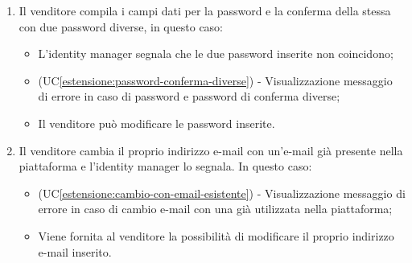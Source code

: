 \begin{itemize}
\begin{enumerate}[label=\lett]
    	\item Il venditore compila i campi dati per la password e la conferma della stessa con due password diverse, in questo caso:
    	\begin{itemize}
    		\item L'identity manager segnala che le due password inserite non coincidono;
    		\item (UC\ref{estensione:password-conferma-diverse}) - Visualizzazione messaggio di errore in caso di password e password di conferma diverse;
    		\item Il venditore può modificare le password inserite.
    	\end{itemize}
    	\item Il venditore cambia il proprio indirizzo e-mail con un'e-mail già presente nella piattaforma e l'identity manager lo segnala. In questo caso:
    	\begin{itemize}
    		\item (UC\ref{estensione:cambio-con-email-esistente}) - Visualizzazione messaggio di errore in caso di cambio e-mail con una già utilizzata nella piattaforma;
    		\item Viene fornita al venditore la possibilità di modificare il proprio indirizzo e-mail inserito.
    	\end{itemize}
    \end{enumerate}
\end{itemize}

\label{modifica-informazioni-venditore.nome}

